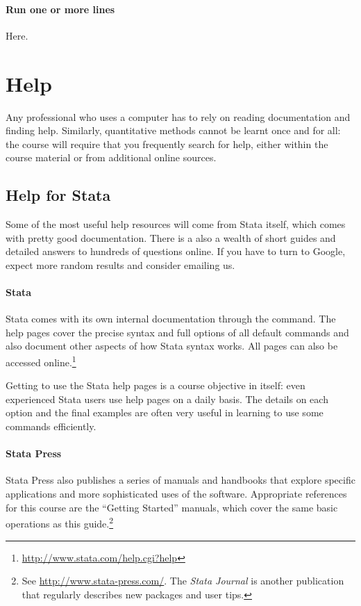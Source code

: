 \paragraph{Run one or more lines}%
%
Here.




%
\section{Help}

Any professional who uses a computer has to rely on reading documentation and finding help. Similarly, quantitative methods cannot be learnt once and for all: the course will require that you frequently search for help, either within the course material or from additional online sources.


%
%
\subsection{Help for Stata}

Some of the most useful help resources will come from Stata itself, which comes with pretty good documentation. There is a also a wealth of short guides and detailed answers to hundreds of questions online. If you have to turn to Google, expect more random results and consider emailing us.


\paragraph{Stata }%
%
Stata comes with its own internal documentation through the  command. The help pages cover the precise syntax and full options of all default commands and also document other aspects of how Stata syntax works. All pages can also be accessed online.\footnote{\url{http://www.stata.com/help.cgi?help}}

Getting to use the Stata help pages is a course objective in itself: even experienced Stata users use help pages on a daily basis. The details on each option and the final examples are often very useful in learning to use some commands efficiently.


\paragraph{Stata Press}%
%
Stata Press also publishes a series of manuals and handbooks that explore specific applications and more sophisticated uses of the software. Appropriate references for this course are the ``Getting Started'' manuals, which cover the same basic operations as this guide.\footnote{See \url{http://www.stata-press.com/}. The \emph{Stata Journal} is another publication that regularly describes new packages and user tips.} %


